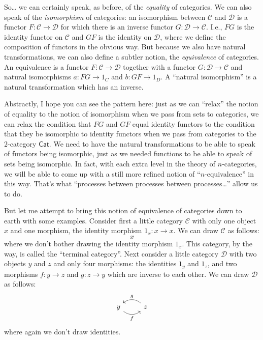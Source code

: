 \documentclass{article}
\begin{document}
So\ldots{} we can certainly speak, as before, of the \emph{equality} of
categories. We can also speak of the \emph{isomorphism} of categories:
an isomorphism between \(\mathcal{C}\) and \(\mathcal{D}\) is a functor
\(F\colon\mathcal{C}\to\mathcal{D}\) for which there is an inverse
functor \(G\colon\mathcal{D}\to\mathcal{C}\). I.e., \(FG\) is the
identity functor on \(\mathcal{C}\) and \(GF\) is the identity on
\(\mathcal{D}\), where we define the composition of functors in the
obvious way. But because we also have natural transformations, we can
also define a subtler notion, the \emph{equivalence} of categories. An
equivalence is a functor \(F\colon\mathcal{C}\to\mathcal{D}\) together
with a functor \(G\colon\mathcal{D}\to\mathcal{C}\) and natural
isomorphisms \(a\colon FG\to 1_C\) and \(b\colon GF \to 1_D\). A
``natural isomorphism'' is a natural transformation which has an
inverse.

Abstractly, I hope you can see the pattern here: just as we can
``relax'' the notion of equality to the notion of isomorphism when we
pass from sets to categories, we can relax the condition that \(FG\) and
\(GF\) equal identity functors to the condition that they be isomorphic
to identity functors when we pass from categories to the \(2\)-category
\(\mathsf{Cat}\). We need to have the natural transformations to be able
to speak of functors being isomorphic, just as we needed functions to be
able to speak of sets being isomorphic. In fact, with each extra level
in the theory of \(n\)-categories, we will be able to come up with a
still more refined notion of ``\(n\)-equivalence'' in this way. That's
what ``processes between processes between processes\ldots{}'' allow us
to do.

But let me attempt to bring this notion of equivalence of categories
down to earth with some examples. Consider first a little category
\(\mathcal{C}\) with only one object \(x\) and one morphism, the
identity morphism \(1_x\colon x\to x\). We can draw \(\mathcal{C}\) as
follows: \[x\] where we don't bother drawing the identity morphism
\(1_x\). This category, by the way, is called the ``terminal category''.
Next consider a little category \(\mathcal{D}\) with two objects \(y\)
and \(z\) and only four morphisms: the identities \(1_y\) and \(1_z\),
and two morphisms \(f\colon y\to z\) and \(g\colon z\to y\) which are
inverse to each other. We can draw \(\mathcal{D}\) as follows: \[
  \begin{tikzcd}
    y \rar[bend right=40,swap,"f"] & z \lar[bend right=40,swap,"g"]
  \end{tikzcd}
\] where again we don't draw identities.
\end{document}
